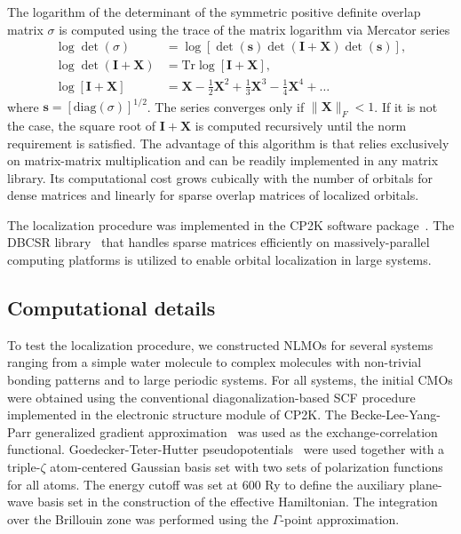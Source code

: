 \documentclass[aps,prl,reprint,amsmath,amssymb]{revtex4-1}
\begin{document}
The logarithm of the determinant of the symmetric positive definite overlap matrix $\sigma$ is computed using the trace of the matrix logarithm via Mercator series
%
\begin{equation} \label{eq:mercator}
\begin{split}
\log \det \left( \sigma \right) &= \log \left[ \det(\mathbf{s}) \det(\mathbf{I} + \mathbf{X}) \det(\mathbf{s}) \right], \\
\log \det \left( \mathbf{I} + \mathbf{X} \right) &= \text{Tr} \log \left[ \mathbf{I} + \mathbf{X} \right], \\
\log \left[ \mathbf{I} + \mathbf{X} \right] &= \mathbf{X} - \frac{1}{2}\mathbf{X}^2  + \frac{1}{3}\mathbf{X}^3 - \frac{1}{4}\mathbf{X}^4 + \ldots
\end{split}
\end{equation}
%
where $\mathbf{s}=\left[\text{diag}(\sigma)\right]^{1/2}$. The series converges only if $\|\mathbf{X}\|_F < 1$. If it is not the case, the square root of $\mathbf{I}+\mathbf{X}$ is computed recursively until the norm requirement is satisfied. The advantage of this algorithm is that relies exclusively on matrix-matrix multiplication and can be readily implemented in any matrix library. Its computational cost grows cubically with the number of orbitals for dense matrices and linearly for sparse overlap matrices of localized orbitals.

The localization procedure was implemented in the CP2K software package~\cite{cp2kgeneral}. The DBCSR library~\cite{borstnik2014sparse} that handles sparse matrices efficiently on massively-parallel computing platforms is utilized to enable orbital localization in large systems.

\subsection{Computational details}

To test the localization procedure, we constructed NLMOs for several systems ranging from a simple water molecule to complex molecules with non-trivial bonding patterns and to large periodic systems. 
%
For all systems, the initial CMOs were obtained using the conventional diagonalization-based SCF procedure implemented in the electronic structure module of CP2K. 
The Becke-Lee-Yang-Parr generalized gradient approximation~\cite{becke1988density, lee1988development} was used as the exchange-correlation functional.
Goedecker-Teter-Hutter pseudopotentials~\cite{goedecker1996separable} were used together with a triple-$\zeta$ atom-centered Gaussian basis set with two sets of polarization functions for all atoms. 
The energy cutoff was set at 600 Ry to define the auxiliary plane-wave basis set in the construction of the effective Hamiltonian. 
The integration over the Brillouin zone was performed using the $\Gamma$-point approximation.
\end{document}
